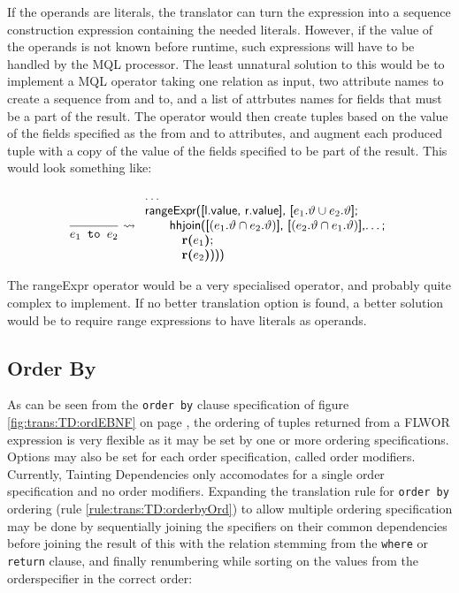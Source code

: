 If the operands are literals, the translator can turn the expression into a sequence construction expression
containing the needed literals. However, if the value of the operands is not known before runtime, such
expressions will have to be handled by the MQL processor. The least unnatural solution to this would be to
implement a MQL operator taking one relation as input, two attribute names to create a sequence from and to, and a
list of attrbutes names for fields that must be a part of the result. The operator would then create tuples based
on the value of the fields specified as the from and to attributes, and augment each produced tuple with a copy of
the value of the fields specified to be part of the result. This would look something like:

\begin{equation*}
\frac{}{e_1 \mbox{\texttt{ to }} e_2} \leadsto
\begin{array}{l}
\mbox{\textsf{\ldots}}\\
\mbox{\textsf{rangeExpr([l.value, r.value], [}}e_1.\vartheta\cup e_2.\vartheta\mbox{\textsf{];}} \\ \quad\quad
\mbox{\textsf{hhjoin([}}(e_1.\vartheta\cap e_2.\vartheta)\mbox{\textsf{],
[}}(e_2.\vartheta\cap e_1.\vartheta) \mbox{\textsf{],\ldots;}} \\ \quad\quad \quad 
\mbox{\textbf{r(}}e_1\mbox{\textbf{)};} \\ \quad\quad \quad
\mbox{\textbf{r(}}e_2\mbox{\textbf{)}\textsf{)))}}
\end{array}
\end{equation*}

The \textsf{rangeExpr} operator would be a very specialised operator, and probably quite complex to implement.
If no better translation option is found, a better solution would be to require range expressions to have literals
as operands.

\subsection{Order By}
\label{sect:disc:orderby}

As can be seen from the \texttt{order by} clause specification of figure \ref{fig:trans:TD:ordEBNF} on page
\pageref{fig:trans:TD:ordEBNF}, the ordering of tuples returned from a FLWOR expression is very flexible as it may
be set by one or more ordering specifications. Options may also be set for each order specification, called order
modifiers. Currently, Tainting Dependencies only accomodates for a single order specification and no order
modifiers. Expanding the translation rule for \texttt{order by} ordering (rule \ref{rule:trans:TD:orderbyOrd}) to
allow multiple ordering specification may be done by sequentially joining the specifiers on their common
dependencies before joining the result of this with the relation stemming from the \texttt{where} or
\texttt{return} clause, and finally renumbering while sorting on the values from the orderspecifier in the correct
order:

